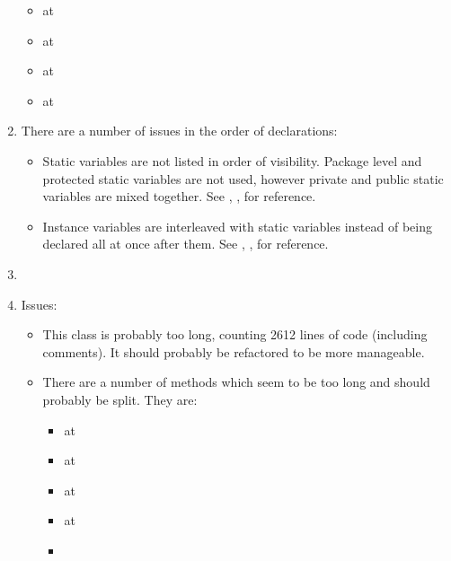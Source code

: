 \begin{enumerate}
\begin{itemize}
		\item {} at 
		\item {} at 
		\item {} at 
		\item {} at 
		\end{itemize}
	\item {} There are a number of issues in the order of declarations:
		\begin{itemize}
			\item Static variables are not listed in order of visibility. Package level and protected static variables are not used, however private and public static variables are mixed together. See , ,  for reference.
			\item Instance variables are interleaved with static variables instead of being declared all at once after them. See , ,  for reference. 
		\end{itemize}
	\item {} 
	\item {} Issues:
		\begin{itemize}
			\item This class is probably too long, counting 2612 lines of code (including comments). It should probably be refactored to be more manageable. 
			\item There are a number of methods which seem to be too long and should probably be split. They are:
				\begin{itemize}
				\item {} at 
				\item {} at 
				\item {} at 
				\item {} at 
				\item {}
\end{itemize}
\end{itemize}
\end{enumerate}
